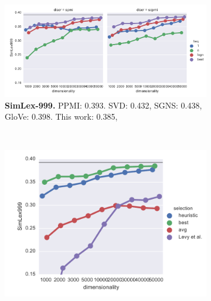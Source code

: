 \begin{figure}
  \centering
  \begin{subfigure}[t]{0.6\textwidth}
    \includegraphics[width=\textwidth]{supplement/figures/SimLex999-best}
    \caption{\scriptsize \textbf{SimLex-999.}
      PPMI: 0.393.
      SVD: 0.432,
      SGNS: 0.438,
      GloVe: 0.398.
      This work: 0.385,
    }
    \label{fig:best-simlex}
  \end{subfigure}
  ~
  \begin{subfigure}[t]{0.37\textwidth}
    \includegraphics[width=\textwidth]{supplement/figures/SimLex999-global-best}
    \caption{}
    \label{fig:global-best-simlex}
  \end{subfigure}


\end{figure}
